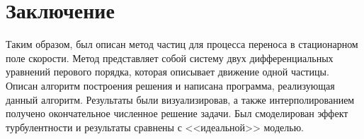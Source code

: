 \section{Заключение}
    Таким образом, был описан метод частиц для процесса переноса в стационарном поле скорости. Метод представляет собой систему двух дифференциальных уравнений перового порядка, которая описывает движение одной частицы. Описан алгоритм построения решения и написана программа, реализующая данный алгоритм. Результаты были визуализировав, а также интерполированием получено окончательное численное решение задачи. Был смоделирован эффект турбулентности и результаты сравнены с <<идеальной>> моделью.
